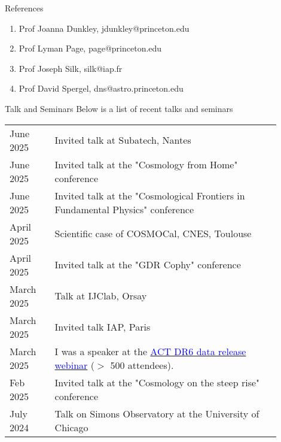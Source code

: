 \documentclass{resume} %
\newcommand{\TIB}[1]{\textcolor{blue}{#1}}
\begin{document}
\begin{rSection}{References }

\begin{enumerate}
\item Prof Joanna Dunkley, jdunkley@princeton.edu
\item Prof Lyman Page, page@princeton.edu
\item Prof Joseph Silk, silk@iap.fr
\item Prof David Spergel, dns@astro.princeton.edu
\end{enumerate}

\end{rSection}

\newpage

\begin{rSection}{Talk and Seminars }
Below is a list of recent talks and seminars 

\begin{table}[h]
{\def\arraystretch{1.5}\tabcolsep=0pt
\begin{tabular}{p{0.15\linewidth}p{0.75\linewidth}}
 June 2025 & Invited talk at Subatech, Nantes   \\
 June 2025 & Invited talk at the "Cosmology from Home" conference   \\
 June 2025 &  Invited talk at  the "Cosmological Frontiers in Fundamental Physics" conference   \\
 April 2025 & Scientific case of COSMOCal, CNES, Toulouse   \\
 April 2025 &   Invited talk at the "GDR Cophy" conference   \\
 March 2025 &  Talk at IJClab, Orsay   \\
 March 2025 &  Invited talk IAP, Paris   \\
 March 2025 &  I was a speaker at the  \href{https://www.youtube.com/watch?v=sETYHrDBXQg}{\TIB{ACT DR6 data release webinar}} ($>$ 500 attendees).     \\
 Feb 2025 & Invited talk at the "Cosmology on the steep rise" conference   \\
 July 2024 &  Talk on Simons Observatory at the University of Chicago 
\end{tabular}
}
\end{table}

\end{rSection}
\end{document}
